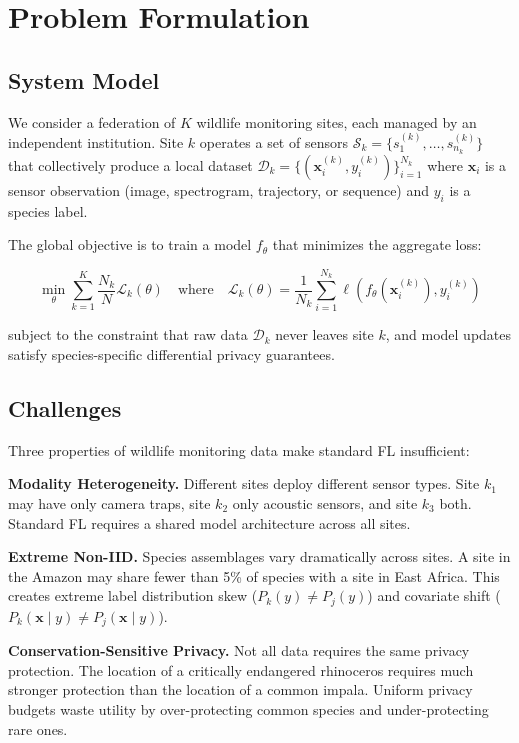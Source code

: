 \section{Problem Formulation}

\label{sec:formulation}

\subsection{System Model}

We consider a federation of $K$ wildlife monitoring sites, each managed by an independent institution.
Site $k$ operates a set of sensors $\mathcal{S}_k = \{s_1^{(k)}, \ldots, s_{n_k}^{(k)}\}$ that collectively produce a local dataset $\mathcal{D}_k = \{(\mathbf{x}_i^{(k)}, y_i^{(k)})\}_{i=1}^{N_k}$ where $\mathbf{x}_i$ is a sensor observation (image, spectrogram, trajectory, or sequence) and $y_i$ is a species label.

The global objective is to train a model $f_\theta$ that minimizes the aggregate loss:

\begin{equation}
    \min_\theta \sum_{k=1}^{K} \frac{N_k}{N} \mathcal{L}_k(\theta) \quad \text{where} \quad \mathcal{L}_k(\theta) = \frac{1}{N_k} \sum_{i=1}^{N_k} \ell(f_\theta(\mathbf{x}_i^{(k)}), y_i^{(k)})
\end{equation}

\noindent subject to the constraint that raw data $\mathcal{D}_k$ never leaves site $k$, and model updates satisfy species-specific differential privacy guarantees.

\subsection{Challenges}

Three properties of wildlife monitoring data make standard FL insufficient:

\textbf{Modality Heterogeneity.}
Different sites deploy different sensor types.
Site $k_1$ may have only camera traps, site $k_2$ only acoustic sensors, and site $k_3$ both.
Standard FL requires a shared model architecture across all sites.

\textbf{Extreme Non-IID.}
Species assemblages vary dramatically across sites.
A site in the Amazon may share fewer than 5\% of species with a site in East Africa.
This creates extreme label distribution skew ($P_k(y) \neq P_j(y)$) and covariate shift ($P_k(\mathbf{x} \mid y) \neq P_j(\mathbf{x} \mid y)$).

\textbf{Conservation-Sensitive Privacy.}
Not all data requires the same privacy protection.
The location of a critically endangered rhinoceros requires much stronger protection than the location of a common impala.
Uniform privacy budgets waste utility by over-protecting common species and under-protecting rare ones.

